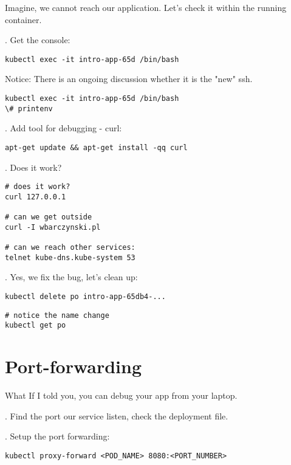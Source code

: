 \documentclass[12pt, letterpaper]{article}
\begin{document}
Imagine, we cannot reach our application. Let's check it within the running container.

. Get the console:

\begin{verbatim}
kubectl exec -it intro-app-65d /bin/bash
\end{verbatim}

Notice: There is an ongoing discussion whether it is the "new" ssh.

\begin{verbatim}
kubectl exec -it intro-app-65d /bin/bash
\# printenv
\end{verbatim}

. Add tool for debugging - curl:

\begin{verbatim}
apt-get update && apt-get install -qq curl
\end{verbatim}

. Does it work?

\begin{verbatim}
# does it work?
curl 127.0.0.1

# can we get outside
curl -I wbarczynski.pl

# can we reach other services:
telnet kube-dns.kube-system 53
\end{verbatim}

. Yes, we fix the bug, let's clean up:

\begin{verbatim}
kubectl delete po intro-app-65db4-...
\end{verbatim}


\begin{verbatim}
# notice the name change
kubectl get po
\end{verbatim}

%
%
%
\section{Port-forwarding}

What If I told you, you can debug your app from your laptop.

. Find the port our service listen, check the deployment file.

. Setup the port forwarding:

\begin{verbatim}
kubectl proxy-forward <POD_NAME> 8080:<PORT_NUMBER>
\end{verbatim}
\end{document}
